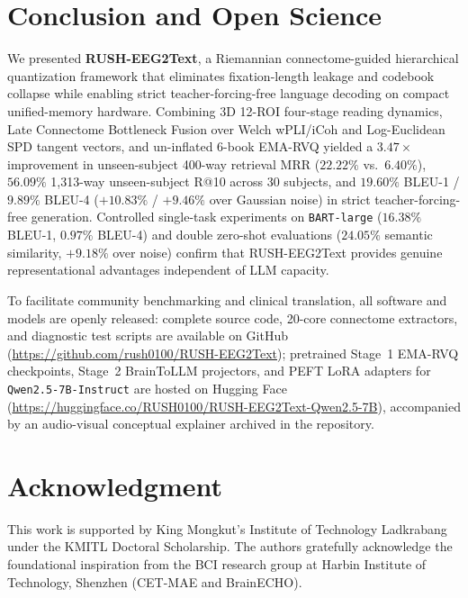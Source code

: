 \documentclass[journal]{IEEEtran}
\begin{document}
\section{Conclusion and Open Science}
We presented \textbf{RUSH-EEG2Text}, a Riemannian connectome-guided hierarchical quantization framework that eliminates fixation-length leakage and codebook collapse while enabling strict teacher-forcing-free language decoding on compact unified-memory hardware. Combining 3D 12-ROI four-stage reading dynamics, Late Connectome Bottleneck Fusion over Welch wPLI/iCoh and Log-Euclidean SPD tangent vectors, and un-inflated 6-book EMA-RVQ yielded a $3.47\times$ improvement in unseen-subject 400-way retrieval MRR ($22.22\%$ vs.\ $6.40\%$), $56.09\%$ 1,313-way unseen-subject R@10 across 30 subjects, and $19.60\%$ BLEU-1 / $9.89\%$ BLEU-4 ($+10.83\%$ / $+9.46\%$ over Gaussian noise) in strict teacher-forcing-free generation. Controlled single-task experiments on \texttt{BART-large} ($16.38\%$ BLEU-1, $0.97\%$ BLEU-4) and double zero-shot evaluations ($24.05\%$ semantic similarity, $+9.18\%$ over noise) confirm that RUSH-EEG2Text provides genuine representational advantages independent of LLM capacity.

To facilitate community benchmarking and clinical translation, all software and models are openly released: complete source code, 20-core connectome extractors, and diagnostic test scripts are available on GitHub (\url{https://github.com/rush0100/RUSH-EEG2Text}); pretrained Stage~1 EMA-RVQ checkpoints, Stage~2 BrainToLLM projectors, and PEFT LoRA adapters for \texttt{Qwen2.5-7B-Instruct} are hosted on Hugging Face (\url{https://huggingface.co/RUSH0100/RUSH-EEG2Text-Qwen2.5-7B}), accompanied by an audio-visual conceptual explainer archived in the repository.

\section*{Acknowledgment}
This work is supported by King Mongkut's Institute of Technology Ladkrabang under the KMITL Doctoral Scholarship. The authors gratefully acknowledge the foundational inspiration from the BCI research group at Harbin Institute of Technology, Shenzhen (CET-MAE and BrainECHO).

\balance
{\small


}
\end{document}
